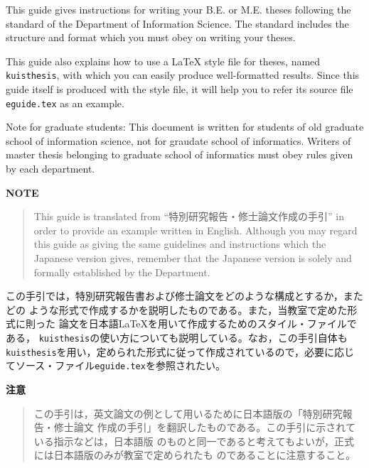 \documentclass[master,english]{kuisthesis}
\date{Feburary 15, 1996}			%
\begin{document}
\maketitle					%

\begin{eabstract}				%
This guide gives instructions for writing your B.E. or M.E. theses following
the standard of the Department of Information Science.  The
standard includes the structure and format which you must obey on writing
your theses.

This guide also explains how to use a \LaTeX{} style file for theses, named
\verb|kuisthesis|, with which you can easily produce well-formatted results.
Since this guide itself is produced with the style file, it will help you to
refer its source file \verb|eguide.tex| as an example.

Note for graduate students: This document is written for students of
old graduate school of information science, not for graudate school of
informatics. Writers of master thesis belonging to graduate school
of informatics must obey rules given by each department.

\par\bigskip\centerline{\bf NOTE}
\begin{quote}
This guide is translated from ``特別研究報告・修士論文作成の手引'' in order
to provide an example written in English.  Although you may regard this
guide as giving the same guidelines and instructions which the Japanese
version gives, remember that the Japanese version is solely and formally
established by the Department.
\end{quote}
\end{eabstract}

\begin{jabstract}				%
この手引では，特別研究報告書および修士論文をどのような構成とするか，またどの
ような形式で作成するかを説明したものである。また，当教室で定めた形式に則った
論文を日本語\LaTeX を用いて作成するためのスタイル・ファイルである， 
\verb|kuisthesis|の使い方についても説明している。なお，この手引自体も
\verb|kuisthesis|を用い，定められた形式に従って作成されているので，必要に応じ
てソース・ファイル\verb|eguide.tex|を参照されたい。

\par\bigskip\centerline{\bf 注意}
\begin{quote}
この手引は，英文論文の例として用いるために日本語版の「特別研究報告・修士論文
作成の手引」を翻訳したものである。この手引に示されている指示などは，日本語版
のものと同一であると考えてもよいが，正式には日本語版のみが教室で定められたも
のであることに注意すること。
\end{quote}
\end{jabstract}
\end{document}
